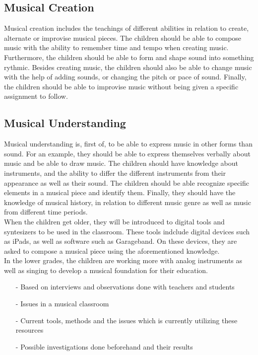 	\subsection*{Musical Creation}
	Musical creation includes the teachings of different abilities in relation to create, alternate or improvise musical pieces. The children should be able to compose music with the ability to remember time and tempo when creating music. Furthermore, the children should be able to form and shape sound into something rythmic. Besides creating music, the children should also be able to change music with the help of adding sounds, or changing the pitch or pace of sound. Finally, the children should be able to improvise music without being given a specific assignment to follow.
	
	\subsection*{Musical Understanding}
	Musical understanding is, first of, to be able to express music in other forms than sound. For an example, they should be able to express themselves verbally  about music and be able to draw music. The children should have knowledge about instruments, and the ability to differ the different instruments from their appearance as well as their sound. The children should be able recognize specific elements in a musical piece and identify them. Finally, they should have the knowledge of musical history, in relation to different music genre as well as music from different time periods.
	\\
	
	When the children get older, they will be introduced to digital tools and syntesizers to be used in the classroom. These tools indclude digital devices such as iPads, as well as software such as Garageband. On these devices, they are asked to compose a musical piece using the aforementioned knowledge.\\
	In the lower grades, the children are working more with analog instruments as well as singing to develop a musical foundation for their education.
	\\
\begin{itemize}
	\item[-] Based on interviews and observations done with teachers and students
	\item[-] Issues in a musical classroom
	\item[-] Current tools, methods and the issues which is currently utilizing these resources
	\item[-] Possible investigations done beforehand and their results	
\end{itemize}

